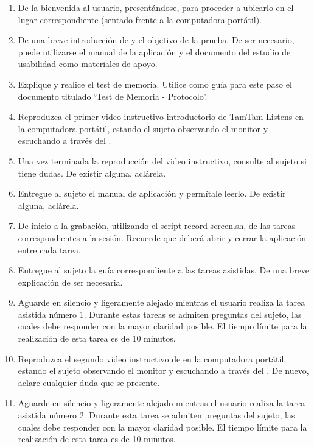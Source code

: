 \begin{enumerate}
    \item De la bienvenida al usuario, present\'andose, para proceder a ubicarlo en el lugar
    correspondiente (sentado frente a la computadora port\'atil).
    \item De una breve introducci\'on de  y el objetivo de la prueba. 
    De ser necesario, puede utilizarse el manual de la aplicaci\'on y el documento del estudio de 
    usabilidad como materiales de apoyo.
    \item Explique y realice el test de memoria. Utilice como gu\'ia para este paso el documento titulado 
    ‘Test de Memoria - Protocolo’.
    \item Reproduzca el primer video instructivo introductorio de TamTam Listens en la computadora 
    port\'atil, estando el sujeto observando el monitor y escuchando a trav\'es del .
    \item Una vez terminada la reproducci\'on del video instructivo, consulte al sujeto si tiene dudas.
    De existir alguna, acl\'arela.
    \item Entregue al sujeto el manual de aplicaci\'on y perm\'itale leerlo. De existir alguna, acl\'arela.
    \item De inicio a la grabaci\'on, utilizando el script record-screen.sh, de las tareas
    correspondientes a la sesi\'on. Recuerde que deber\'a abrir y cerrar la aplicaci\'on entre 
    cada tarea.
    \item Entregue al sujeto la gu\'ia correspondiente a las tareas asistidas. De una 
    breve explicaci\'on de ser necesaria.
    \item Aguarde en silencio y ligeramente alejado mientras el usuario realiza la tarea 
    asistida n\'umero 1. Durante estas tareas se admiten preguntas del sujeto, las cuales debe responder 
    con la mayor claridad posible. El tiempo l\'imite para la realizaci\'on de esta tarea es de 
    10 minutos.
    \item Reproduzca el segundo video instructivo de  en la computadora 
    port\'atil, estando el sujeto observando el monitor y escuchando a trav\'es del . 
    De nuevo, aclare cualquier duda que se presente.
    \item Aguarde en silencio y ligeramente alejado mientras el usuario realiza la tarea asistida 
    n\'umero 2. Durante esta tarea se admiten preguntas del sujeto, las cuales debe responder con la
    mayor claridad posible. El tiempo l\'imite para la realizaci\'on de esta tarea es de 10 minutos.

\end{enumerate}
